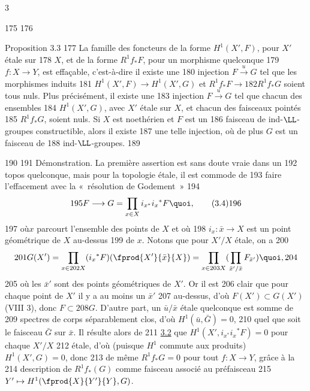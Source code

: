 3	\documentclass[10pt]{../fichiers-configuration-latex/smfart}
\begin{document}
   175	
   176	\begin{enonce*}{Proposition 3.3}
   177	La famille des foncteurs de la forme $H^1(X',F)$, pour $X'$ étale sur
   178	$X$, et de la forme $R^1f_{\ast}F$, pour un morphisme quelconque
   179	$f:X\rightarrow Y$, est effaçable, c'est-à-dire il existe une
   180	injection $F\xrightarrow{u}G$ tel que les morphismes induits
   181	$H^1(X',F)\rightarrow H^1(X',G)$ et $R^1f_{\ast}F\rightarrow
   182	R^1f_{\ast}G$ soient tous nuls. Plus précisément, il existe une
   183	injection $F\xrightarrow{u}G$ tel que chacun des ensembles
   184	$H^1(X',G)$, avec $X'$ étale sur $X$, et chacun des faisceaux pointés
   185	$R^1f_{\ast}G$, soient nuls. Si $X$ est noethérien et $F$ est un
   186	faisceau de ind-$\LL$-groupes constructible, alors il existe
   187	une telle injection, où de plus $G$ est un faisceau de
   188	ind-$\LL$-groupes.
   189	\end{enonce*}
   190	
   191	Démonstration. La première assertion est sans doute vraie dans un
   192	topos quelconque, mais pour la topologie étale, il est commode de
   193	faire l'effacement avec la « résolution de Godement » 
   194	\begin{equation*}
   195	F\longrightarrow G=\prod_{x\in X}i_{x^{\ast}}i_{x}{}^{\ast}F{\quoi},\tag{3.4}
   196	\end{equation*}
   197	où\pageoriginale $x$ parcourt l'ensemble des points de $X$ et où
   198	$i_{x}:\bar{x}\rightarrow X$ est un point géométrique de $X$ au-dessus
   199	de $x$. Notons que pour $X'/X$ étale, on a
   200	$$
   201	G(X')=\prod_{x\in
   202	  X}(i_{x}{}^{\ast}F)(\fprod{X'}{\bar{x}}{X})=\prod_{x\in
   203	  X}(\prod_{\bar{x}' /\bar{x}}F_{\bar{x}'}){\quoi},
   204	$$
   205	où les $\bar{x}'$ sont des points géométriques de $X'$. Or il est
   206	clair que pour chaque point de $X'$ il y a au moins un $\bar{x}'$
   207	au-dessus, d'où $F(X')\subset G(X')$ (VIII 3), donc $F\subset
   208	G$. D'autre part, un $\bar{u}/\bar{x}$ étale quelconque est somme de
   209	spectres de corps séparablement clos, d'où $H^1(\bar{u},\bar{G})=0$,
   210	quel que soit le faisceau $\bar{G}$ sur $\bar{x}$. Il résulte alors de
   211	\hyperref[XII.prop3.2]{3.2} que $H^1(X', i_{x^{\ast}}i_x{}^{\ast}F)=0$ pour chaque $X'/X$
   212	étale, d'où (puisque $H^1$ commute aux produits) $H^1(X',G)=0$, donc
   213	de même $R^1f_{\ast}G=0$ pour tout $f:X\rightarrow Y$, grâce à la
   214	description de $R^1f_{\ast}(G)$ comme faisceau associé au préfaisceau
   215	$Y'\mapsto H^1(\fprod{X}{Y'}{Y},G)$.
\end{document}
